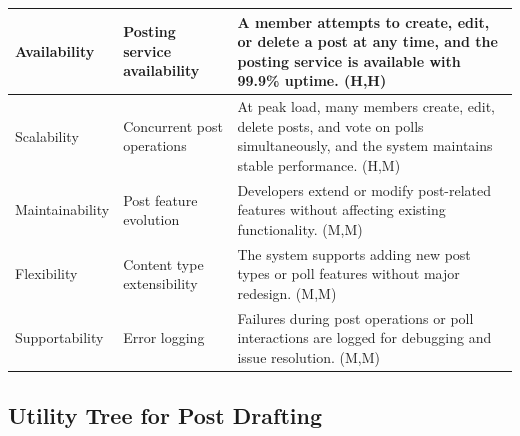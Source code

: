 \documentclass{article}
\begin{document}
\begin{table}[H]
\begin{tabular}{|p{3cm}|p{4cm}|p{7cm}|}
Availability
& Posting service availability
& A member attempts to create, edit, or delete a post at any time, and the posting service is available with 99.9\% uptime. (H,H) \\
\hline

Scalability
& Concurrent post operations
& At peak load, many members create, edit, delete posts, and vote on polls simultaneously, and the system maintains stable performance. (H,M) \\
\hline

Maintainability
& Post feature evolution
& Developers extend or modify post-related features without affecting existing functionality. (M,M) \\
\hline

Flexibility
& Content type extensibility
& The system supports adding new post types or poll features without major redesign. (M,M) \\
\hline

Supportability
& Error logging
& Failures during post operations or poll interactions are logged for debugging and issue resolution. (M,M) \\
\hline

\end{tabular}
\end{table}

\subsection{Utility Tree for Post Drafting}
\end{document}
